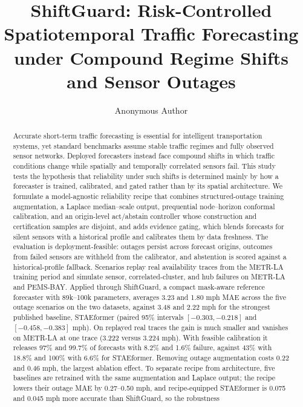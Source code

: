 \documentclass[preprint,12pt]{elsarticle}
\begin{document}
\begin{frontmatter}

\title{ShiftGuard: Risk-Controlled Spatiotemporal Traffic Forecasting under
Compound Regime Shifts and Sensor Outages}

\author[aff1]{Anonymous Author}
\address[aff1]{Anonymous Institution}

\begin{abstract}
Accurate short-term traffic forecasting is essential for intelligent
transportation systems, yet standard benchmarks assume stable traffic regimes
and fully observed sensor networks. Deployed forecasters instead face compound
shifts in which traffic conditions change while spatially and temporally
correlated sensors fail. This study tests the hypothesis that reliability under
such shifts is determined mainly by how a forecaster is trained, calibrated, and
gated rather than by its spatial architecture. We formulate a model-agnostic
reliability recipe that combines structured-outage training augmentation, a
Laplace median--scale output, prequential node--horizon conformal calibration,
and an origin-level act/abstain controller whose construction and
certification samples are disjoint, and adds evidence gating, which blends
forecasts for silent sensors with a historical profile and calibrates them by
data freshness. The evaluation is deployment-feasible: outages persist across
forecast origins, outcomes from failed sensors are withheld from the calibrator,
and abstention is scored against a historical-profile fallback. Scenarios replay
real availability traces from the METR-LA training period and simulate sensor,
correlated-cluster, and hub failures on METR-LA and PEMS-BAY. Applied through
ShiftGuard, a compact mask-aware reference forecaster with 89k--100k parameters,
averages 3.23 and 1.80 mph MAE across the five outage scenarios on the two
datasets, against 3.48 and 2.22 mph for the strongest published baseline,
STAEformer (paired 95\% intervals $[-0.303,-0.218]$ and $[-0.458,-0.383]$ mph).
On replayed real traces the gain is much smaller and vanishes on METR-LA at one
trace (3.222 versus 3.224 mph). With feasible calibration it releases 97\% and
99.7\% of forecasts with 8.2\% and 1.6\% failure, against 43\% with 18.8\% and
100\% with 6.6\% for STAEformer. Removing outage augmentation costs 0.22 and
0.46 mph, the largest ablation effect. To separate recipe from architecture, five
baselines are retrained with the same augmentation and Laplace output;
the recipe lowers their outage MAE by 0.27--0.50 mph, and recipe-equipped
STAEformer is 0.075 and 0.045 mph more accurate than ShiftGuard, so the robustness

\end{abstract}
\end{frontmatter}
\end{document}
